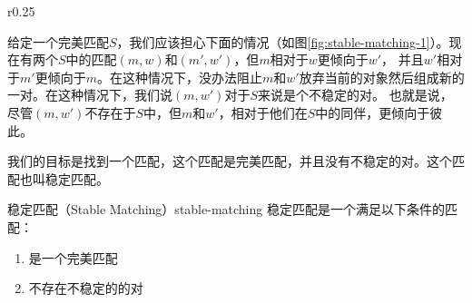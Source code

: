     \begin{wrapfigure}[10]{r}{0.25\linewidth}
        \centering
        \caption{不稳定的情况}
        \label{fig:stable-matching-1}
    \end{wrapfigure}
    给定一个完美匹配$S$，我们应该担心下面的情况（如图\ref{fig:stable-matching-1}）。现在有两个$S$中的匹配$(m,w)$和$(m',w')$，但$m$相对于$w$更倾向于$w'$，
    并且$w'$相对于$m'$更倾向于$m$。在这种情况下，没办法阻止$m$和$w'$放弃当前的对象然后组成新的一对。在这种情况下，我们说$(m,w')$对于$S$来说是个不稳定的对。
    也就是说，尽管$(m,w')$不存在于$S$中，但$m$和$w'$，相对于他们在$S$中的同伴，更倾向于彼此。

    我们的目标是找到一个匹配，这个匹配是完美匹配，并且没有不稳定的对。这个匹配也叫稳定匹配。
    \begin{definition}{稳定匹配（Stable Matching）}{stable-matching}
        稳定匹配是一个满足以下条件的匹配：
        \begin{enumerate}[label=(\roman*)]
            \item 是一个完美匹配
            \item 不存在不稳定的的对
        \end{enumerate}
    \end{definition}    

